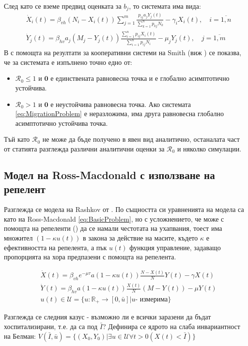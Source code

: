 След като се вземе предвид оценката за $b_j$, то системата има вида:
\begin{equation}
  \label{eq:MigrationProblem}
  \begin{split}
    &\dot{X}_i(t) = \beta_{vh} (N_i - X_i(t)) \sum_{j=1}^{m} \frac{p_{ij} a_j Y_j(t)}{\sum_{k=1}^n p_{kj} N_k} - \gamma_i X_i(t), \quad i=\overline{1, n} \\
    &\dot{Y}_j(t) = \beta_{hv} a_j (M_j - Y_j(t)) \frac{\sum_{i=1}^n p_{ij} X_i(t)}{\sum_{i=1}^n p_{ij} N_i} - \mu_j Y_j(t), \quad j=\overline{1, m}
  \end{split}
\end{equation}
В \cite{Bichara2016} с помощта на резултати за кооперативни системи на Smith (виж \cite{Smith1986}) се показва, че за системата е изпълнено точно едно от:
\begin{itemize}
  \item $\mathscr{R}_0 \leq 1$ и $\mathbf{0}$ е единствената равновесна точка и е глобално асимптотично устойчива.
  \item $\mathscr{R}_0 > 1$ и $\mathbf{0}$ е неустойчива равновесна точка. Ако системата \eqref{eq:MigrationProblem} е неразложима, има друга равновесна глобално асимптотично устойчива точка.
\end{itemize}

Тъй като $\mathscr{R}_0$ не може да бъде получено в явен вид аналитично, останалата част от статията \cite{Bichara2016} разглежда различни аналитични оценки за $\mathscr{R}_0$ и няколко симулации.

\subsection{Модел на Ross-Macdonald с използване на репелент}
Разглежда се модела на Rashkov от \cite{Rashkov2019}. По същността си уравненията на модела са като на Ross-Macdonald \eqref{eq:BasicProblem}, но с усложнението, че може с помощта на репеленти (\cite{Grancaric2019}) да се намали честотата на ухапвания, тоест има множител $(1 - \kappa u(t))$ в закона за действие на масите, където $\kappa$ е ефективността на репелента, а пък $u(t)$ функция управление, задаващо пропорцията на хора предпазени с помощта на репелента.

\begin{equation}
  \label{eq:RepelentProblem}
  \begin{split}
    &\dot{X}(t) = \beta_{vh} e^{-\mu \tau} a (1-\kappa u(t)) \frac{N-X(t)}{N} Y(t) - \gamma X(t) \\
    &\dot{Y}(t) = \beta_{hv} a (1-\kappa u(t)) \frac{X(t)}{N} (M-Y(t)) - \mu Y(t) \\
    &u(t) \in \mathscr{U} = \{u:\mathbb{R}_+ \rightarrow [0, \bar{u}] \vert u \text{- измерима}\}
  \end{split}
\end{equation}

Разглежда се следния казус - възможно ли е всички заразени да бъдат хоспитализирани, т.е. да са под $\bar{I}$?
Дефинира се ядрото на слаба инвариантност на Белман:
$V(\bar{I}, \bar{u}) = \{(X_0, Y_0) \vert \exists{u \in \mathscr{U}}\forall t>0 (X(t) < \bar{I})\}$
